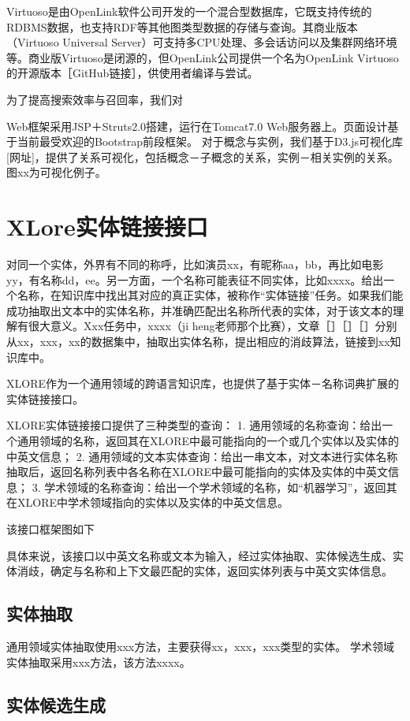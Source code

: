 Virtuoso是由OpenLink软件公司开发的一个混合型数据库，它既支持传统的RDBMS数据，也支持RDF等其他图类型数据的存储与查询。其商业版本（Virtuoso Universal Server）可支持多CPU处理、多会话访问以及集群网络环境等。商业版Virtuoso是闭源的，但OpenLink公司提供一个名为OpenLink Virtuoso的开源版本［GitHub链接］，供使用者编译与尝试。

为了提高搜索效率与召回率，我们对

Web框架采用JSP＋Struts2.0搭建，运行在Tomcat7.0 Web服务器上。页面设计基于当前最受欢迎的Bootstrap前段框架。
对于概念与实例，我们基于D3.js可视化库[网址]，提供了关系可视化，包括概念－子概念的关系，实例－相关实例的关系。图xx为可视化例子。

\section{XLore实体链接接口}

对同一个实体，外界有不同的称呼，比如演员xx，有昵称aa，bb，再比如电影yy，有名称dd，ee。另一方面，一个名称可能表征不同实体，比如xxxx。给出一个名称，在知识库中找出其对应的真正实体，被称作“实体链接”任务。如果我们能成功抽取出文本中的实体名称，并准确匹配出名称所代表的实体，对于该文本的理解有很大意义。Xxx任务中，xxxx（ji heng老师那个比赛），文章［］［］［］分别从xx，xxx，xx的数据集中，抽取出实体名称，提出相应的消歧算法，链接到xx知识库中。

XLORE作为一个通用领域的跨语言知识库，也提供了基于实体－名称词典扩展的实体链接接口。

XLORE实体链接接口提供了三种类型的查询：
1.  通用领域的名称查询：给出一个通用领域的名称，返回其在XLORE中最可能指向的一个或几个实体以及实体的中英文信息；
2.  通用领域的文本实体查询：给出一串文本，对文本进行实体名称抽取后，返回名称列表中各名称在XLORE中最可能指向的实体及实体的中英文信息；
3.  学术领域的名称查询：给出一个学术领域的名称，如“机器学习”，返回其在XLORE中学术领域指向的实体以及实体的中英文信息。

该接口框架图如下

具体来说，该接口以中英文名称或文本为输入，经过实体抽取、实体候选生成、实体消歧，确定与名称和上下文最匹配的实体，返回实体列表与中英文实体信息。


\subsection{实体抽取}
通用领域实体抽取使用xxx方法，主要获得xx，xxx，xxx类型的实体。
学术领域实体抽取采用xxx方法，该方法xxxx。

\subsection{实体候选生成}

